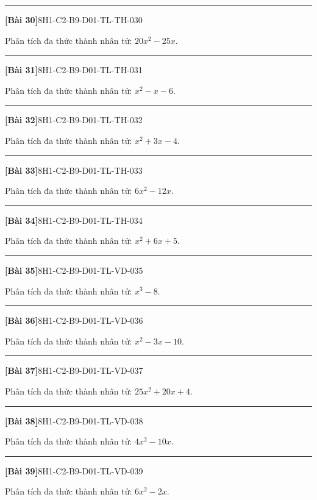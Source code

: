 \documentclass[12pt,a4paper]{article}
\newif\ifloigiai
\newenvironment{cauhoi}[2]{%
  \par\medskip\noindent\rule{\textwidth}{0.4pt}\par\nopagebreak
  \noindent\textbf{[#1]}\hfill{\scriptsize\ttfamily #2}\par\nopagebreak\smallskip}{\par}
\newcommand{\loigiai}[1]{\ifloigiai\par\smallskip\noindent\textit{Lời giải.} #1\par\fi}
\begin{document}
\begin{cauhoi}{Bài 30}{8H1-C2-B9-D01-TL-TH-030}
Phân tích đa thức thành nhân tử: $20x^{2} - 25x$.
\loigiai{Nhân tử chung của các hạng tử là $5x$. Vậy $20x^{2} - 25x=5x(4x - 5)$.}
\end{cauhoi}
\begin{cauhoi}{Bài 31}{8H1-C2-B9-D01-TL-TH-031}
Phân tích đa thức thành nhân tử: $x^{2} - x - 6$.
\loigiai{Nhóm hạng tử: $x^{2} - x - 6=(x^{2} + 2x)+(-3x - 6)=x(x + 2)-3(x + 2)=(x + 2)(x - 3)$.}
\end{cauhoi}
\begin{cauhoi}{Bài 32}{8H1-C2-B9-D01-TL-TH-032}
Phân tích đa thức thành nhân tử: $x^{2} + 3x - 4$.
\loigiai{Nhóm hạng tử: $x^{2} + 3x - 4=(x^{2} + 4x)+(-x - 4)=x(x + 4)-(x + 4)=(x + 4)(x - 1)$.}
\end{cauhoi}
\begin{cauhoi}{Bài 33}{8H1-C2-B9-D01-TL-TH-033}
Phân tích đa thức thành nhân tử: $6x^{2} - 12x$.
\loigiai{Nhân tử chung của các hạng tử là $6x$. Vậy $6x^{2} - 12x=6x(x - 2)$.}
\end{cauhoi}
\begin{cauhoi}{Bài 34}{8H1-C2-B9-D01-TL-TH-034}
Phân tích đa thức thành nhân tử: $x^{2} + 6x + 5$.
\loigiai{Nhóm hạng tử: $x^{2} + 6x + 5=(x^{2} + 5x)+(x + 5)=x(x + 5)+(x + 5)=(x + 5)(x + 1)$.}
\end{cauhoi}
\begin{cauhoi}{Bài 35}{8H1-C2-B9-D01-TL-VD-035}
Phân tích đa thức thành nhân tử: $x^{3}-8$.
\loigiai{$x^{3}-2^{3}=(x-2)(x^{2}+2x+4)$.}
\end{cauhoi}
\begin{cauhoi}{Bài 36}{8H1-C2-B9-D01-TL-VD-036}
Phân tích đa thức thành nhân tử: $x^{2} - 3x - 10$.
\loigiai{Nhóm hạng tử: $x^{2} - 3x - 10=(x^{2} + 2x)+(-5x - 10)=x(x + 2)-5(x + 2)=(x + 2)(x - 5)$.}
\end{cauhoi}
\begin{cauhoi}{Bài 37}{8H1-C2-B9-D01-TL-VD-037}
Phân tích đa thức thành nhân tử: $25x^{2} + 20x + 4$.
\loigiai{$25x^{2} + 20x + 4=(5x)^{2}+2\cdot(5x)\cdot 2+2^{2}=(5x + 2)^{2}$.}
\end{cauhoi}
\begin{cauhoi}{Bài 38}{8H1-C2-B9-D01-TL-VD-038}
Phân tích đa thức thành nhân tử: $4x^{2} - 10x$.
\loigiai{Nhân tử chung của các hạng tử là $2x$. Vậy $4x^{2} - 10x=2x(2x - 5)$.}
\end{cauhoi}
\begin{cauhoi}{Bài 39}{8H1-C2-B9-D01-TL-VD-039}
Phân tích đa thức thành nhân tử: $6x^{2} - 2x$.
\loigiai{Nhân tử chung của các hạng tử là $2x$. Vậy $6x^{2} - 2x=2x(3x - 1)$.}
\end{cauhoi}
\end{document}
